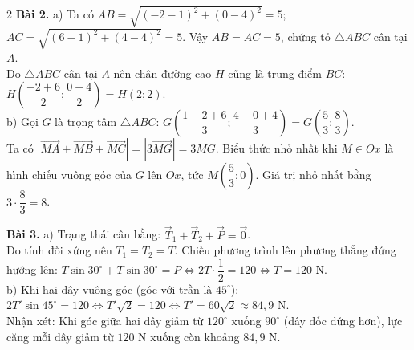 \documentclass[10pt,a4paper]{article}
\begin{document}
\begin{multicols}{2}
\textbf{Bài 2.}
a) Ta có $AB = \sqrt{(-2-1)^2 + (0-4)^2} = 5$; $AC = \sqrt{(6-1)^2 + (4-4)^2} = 5$. Vậy $AB = AC = 5$, chứng tỏ $\triangle ABC$ cân tại $A$.\\
Do $\triangle ABC$ cân tại $A$ nên chân đường cao $H$ cũng là trung điểm $BC$: $H\left(\dfrac{-2+6}{2}; \dfrac{0+4}{2}\right) = H(2; 2)$.\\
b) Gọi $G$ là trọng tâm $\triangle ABC$: $G\left(\dfrac{1-2+6}{3}; \dfrac{4+0+4}{3}\right) = G\left(\dfrac{5}{3}; \dfrac{8}{3}\right)$.\\
Ta có $|\vec{MA} + \vec{MB} + \vec{MC}| = |3\vec{MG}| = 3MG$. Biểu thức nhỏ nhất khi $M \in Ox$ là hình chiếu vuông góc của $G$ lên $Ox$, tức $M\left(\dfrac{5}{3}; 0\right)$. Giá trị nhỏ nhất bằng $3 \cdot \dfrac{8}{3} = 8$.

\textbf{Bài 3.}
a) Trạng thái cân bằng: $\vec{T}_1 + \vec{T}_2 + \vec{P} = \vec{0}$.\\
Do tính đối xứng nên $T_1 = T_2 = T$. Chiếu phương trình lên phương thẳng đứng hướng lên: $T\sin 30^\circ + T\sin 30^\circ = P \Leftrightarrow 2T \cdot \dfrac{1}{2} = 120 \Leftrightarrow T = 120\text{ N}$.\\
b) Khi hai dây vuông góc (góc với trần là $45^\circ$): $2T'\sin 45^\circ = 120 \Leftrightarrow T'\sqrt{2} = 120 \Leftrightarrow T' = 60\sqrt{2} \approx 84{,}9\text{ N}$.\\
Nhận xét: Khi góc giữa hai dây giảm từ $120^\circ$ xuống $90^\circ$ (dây dốc đứng hơn), lực căng mỗi dây giảm từ $120\text{ N}$ xuống còn khoảng $84{,}9\text{ N}$.

\end{multicols}
\end{document}
